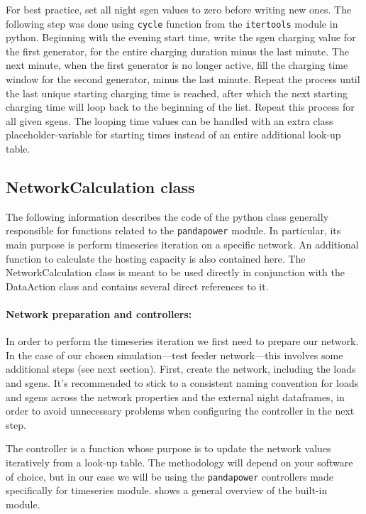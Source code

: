 \documentclass[a4paper,10pt]{report}
\begin{document}
For best practice, set all night sgen values to zero before writing new ones. The following step was done using \texttt{cycle} function from the \texttt{itertools} module in python. Beginning with the evening start time, write the sgen charging value for the first generator, for the entire charging duration minus the last minute. The next minute, when the first generator is no longer active, fill the charging time window for the second generator, minus the last minute. Repeat the process until the last unique starting charging time is reached, after which the next starting charging time will loop back to the beginning of the list. Repeat this process for all given sgens. The looping time values can be handled with an extra class placeholder-variable for starting times instead of an entire additional look-up table.


\subsection{NetworkCalculation class}
The following information describes the code of the python class generally responsible for functions related to the \texttt{pandapower} module. In particular, its main purpose is perform timeseries iteration on a specific network. An additional function to calculate the hosting capacity is also contained here. The NetworkCalculation class is meant to be used directly in conjunction with the DataAction class and contains several direct references to it.

\paragraph{Network preparation and controllers:} In order to perform the timeseries iteration we first need to prepare our network. In the case of our chosen simulation---test feeder network---this involves some additional steps (see next section). First, create the network, including the loads and sgens. It's recommended to stick to a consistent naming convention for loads and sgens across the network properties and the external night dataframes, in order to avoid unnecessary problems when configuring the controller in the next step.

The controller is a function whose purpose is to update the network values iteratively from a look-up table. The methodology will depend on your software of choice, but in our case we will be using the \texttt{pandapower} controllers made specifically for timeseries module.  shows a general overview of the built-in module.
\end{document}
